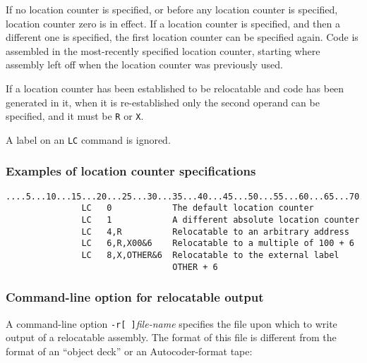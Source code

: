\documentclass[12pt,twoside]{article}
\begin{document}
If no location counter is specified, or before any location counter is
specified, location counter zero is in effect.  If a location counter is
specified, and then a different one is specified, the first location
counter can be specified again.  Code is assembled in the most-recently
specified location counter, starting where assembly left off when the
location counter was previously used.

If a location counter has been established to be relocatable and code has
been generated in it, when it is re-established only the second operand
can be specified, and it must be {\tt R} or {\tt X}.

A label on an {\tt LC} command is ignored.

\subsubsection{Examples of location counter specifications}

{\tt\begin{verbatim}
....5...10...15...20...25...30...35...40...45...50...55...60...65...70..
               LC   0            The default location counter
               LC   1            A different absolute location counter
               LC   4,R          Relocatable to an arbitrary address
               LC   6,R,X00&6    Relocatable to a multiple of 100 + 6
               LC   8,X,OTHER&6  Relocatable to the external label
                                 OTHER + 6
\end{verbatim}}

\subsubsection{Command-line option for relocatable output}\label{reloc-cmd}

A command-line option {\tt -r[ ]}\emph{file-name} specifies the file upon
which to write output of a relocatable assembly.  The format of this file
is different from the format of an ``object deck'' or an Autocoder-format
tape:
\end{document}
